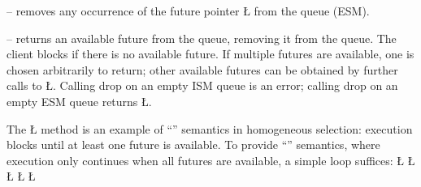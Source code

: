 \documentclass[openright,twoside]{report}
\begin{document}
\begin{prefix}
\item[\LGinlinetrue\LGbegin\lgrinde\L{\LB{\V{remove}(\0\V{Selectee}\0\*\V{n}\0)}}\endlgrinde\LGend{}]
-- removes any occurrence of the future pointer \LGinlinetrue\LGbegin\lgrinde\L{}\endlgrinde\LGend{} from the queue (ESM).
\item[\LGinlinetrue\LGbegin\lgrinde\L{\LB{\V{drop}}}\endlgrinde\LGend{}]
-- returns an available future from the queue, removing it from the queue.
The client blocks if there is no available future.
If multiple futures are available, one is chosen arbitrarily to return;
other available futures can be obtained by further calls to \LGinlinetrue\LGbegin\lgrinde\L{}\endlgrinde\LGend{}.
Calling drop on an empty ISM queue is an error;
calling drop on an empty ESM queue returns \LGinlinetrue\LGbegin\lgrinde\L{}\endlgrinde\LGend{}.
\end{prefix}

The \LGinlinetrue\LGbegin\lgrinde\L{}\endlgrinde\LGend{} method is an example of ``'' semantics in homogeneous selection:
execution blocks until at least one future is available.
To provide ``'' semantics, where execution only continues when all futures are available, a simple loop suffices:
\LGinlinefalse\LGbegin\lgrinde
\L{}
\CE{}\L{}
\CE{}\L{}
\CE{}\L{\LB{}}
\L{\LB{\}}}
\endlgrinde\LGend
\end{document}
